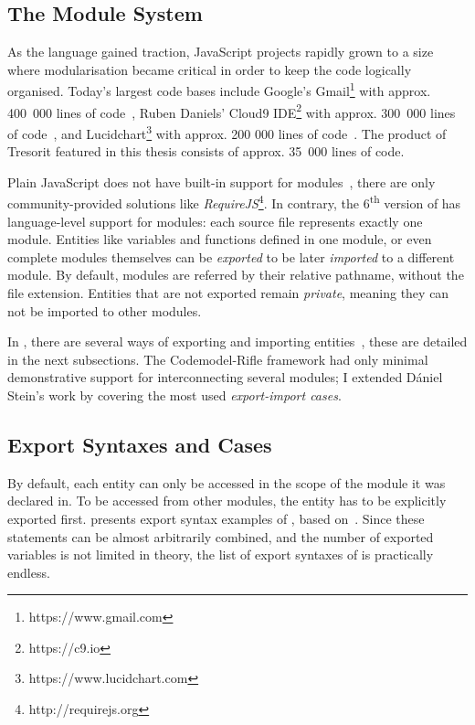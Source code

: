 \subsection{The \es Module System}

As the language gained traction, JavaScript projects rapidly grown to a size where modularisation became critical in order to keep the code logically organised. Today's largest \es code bases include Google's Gmail\footnote{https://www.gmail.com} with approx. 400~000 lines of code~\cite{gmail-loc}, Ruben Daniels' Cloud9 IDE\footnote{https://c9.io} with approx. 300~000 lines of code~\cite{cloud9-loc}, and Lucidchart\footnote{https://www.lucidchart.com} with approx. 200 000 lines of code~\cite{lucidchart-loc}. The product of Tresorit featured in this thesis consists of approx. 35~000 lines of \es code.

Plain JavaScript does not have built-in support for modules~\cite{exploringes6}, there are only community-provided solutions like \emph{RequireJS}\footnote{http://requirejs.org}. In contrary, the 6\textsuperscript{th} version of \es has language-level support for modules: each source file represents exactly one module. Entities like variables and functions defined in one module, or even complete modules themselves can be \emph{exported} to be later \emph{imported} to a different module. By default, modules are referred by their relative pathname, without the file extension. Entities that are not exported remain \emph{private}, meaning they can not be imported to other modules.

In , there are several ways of exporting and importing entities~\cite{exploringes6}, these are detailed in the next subsections. The Codemodel-Rifle framework had only minimal demonstrative support for interconnecting several \es modules; I extended Dániel Stein's work by covering the most used \emph{export-import cases}.


\subsection{Export Syntaxes and Cases}

By default, each entity can only be accessed in the scope of the module it was declared in. To be accessed from other modules, the entity has to be explicitly exported first.  presents export syntax examples of , based on~\cite{export-syntaxes}. Since these statements can be almost arbitrarily combined, and the number of exported variables is not limited in theory, the list of export syntaxes of  is practically endless.

